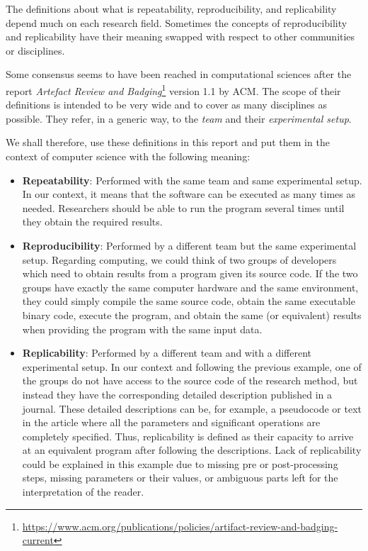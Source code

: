 The definitions about what is repeatability, reproducibility, and replicability depend much on each research field. Sometimes the concepts of reproducibility and replicability have their meaning swapped with respect to other communities or disciplines.

Some consensus seems to have been reached in computational sciences after the report \textit{Artefact Review and Badging}\footnote{\url{https://www.acm.org/publications/policies/artifact-review-and-badging-current}} version 1.1 by ACM. The scope of their definitions is intended to be very wide and to cover as many disciplines as possible. They refer, in a generic way, to the \textit{team} and their \textit{experimental setup}.

We shall therefore, use these definitions in this report and put them in the context of computer science with the following meaning:

\begin{itemize}
    \item \textbf{Repeatability}: Performed with the same team and same experimental setup. In our context, it means that the software can be executed as many times as needed. Researchers should be able to run the program several times until they obtain the required results.
    
    \item \textbf{Reproducibility}: Performed by a different team but the same experimental setup. Regarding computing, we could think of two groups of developers which need to obtain results from a program given its source code. If the two groups have exactly the same computer hardware and the same environment, they could simply compile the same source code, obtain the same executable binary code, execute the program, and obtain the same (or equivalent) results when providing the program with the same input data.

    \item \textbf{Replicability}: Performed by a different team and with a different experimental setup. In our context and following the previous example, one of the groups do not have access to the source code of the research method, but instead they have the corresponding detailed description published in a journal. These detailed descriptions can be, for example, a pseudocode or text in the article where all the parameters and significant operations are completely specified. Thus, replicability is defined as their capacity to arrive at an equivalent program after following the descriptions. Lack of replicability could be explained in this example due to missing pre or post-processing steps, missing parameters or their values, or ambiguous parts left for the interpretation of the reader.
\end{itemize}

